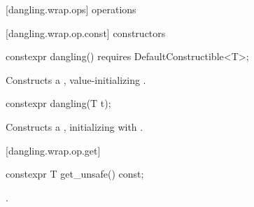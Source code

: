 [dangling.wrap.ops]{ operations}

[dangling.wrap.op.const]{ constructors}

%
\begin{itemdecl}
constexpr dangling() requires DefaultConstructible<T>;
\end{itemdecl}

\begin{itemdescr}
\pnum
\effects Constructs a , value-initializing .
\end{itemdescr}

%
\begin{itemdecl}
constexpr dangling(T t);
\end{itemdecl}

\begin{itemdescr}
\pnum
\effects Constructs a , initializing  with
.
\end{itemdescr}

[dangling.wrap.op.get]{}

%
%
\begin{itemdecl}
constexpr T get_unsafe() const;
\end{itemdecl}

\begin{itemdescr}
\pnum
\returns {}.
\end{itemdescr}

